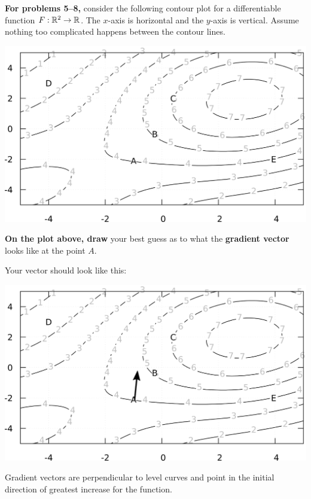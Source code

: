 \documentclass{ximera}
\author{Jim Fowler and Bart Snapp}
\begin{document}
\textbf{For problems 5--8,} consider the following contour plot for a
  differentiable function $F : \mathbb R^2 \to \mathbb R$.  The $x$-axis is
  horizontal and the $y$-axis is vertical.  Assume nothing too
  complicated happens between the contour lines.
\begin{image}[6in]
\includegraphics{contourPlot.png}
\end{image}

\begin{problem}
\textbf{On the plot above, draw} your best guess as to what the
\textbf{gradient vector} looks like at the point $A$.
\begin{prompt}
  \begin{multipleChoice}
\end{multipleChoice}
  \begin{feedback}
    Your vector should look like this:
    \begin{image}
      \includegraphics{contourWithGrad.png}
    \end{image}
    Gradient vectors are perpendicular to level curves and point in the initial direction of greatest increase for the function.
  \end{feedback}
\end{prompt}

\vfill

\end{problem}
\end{document}
